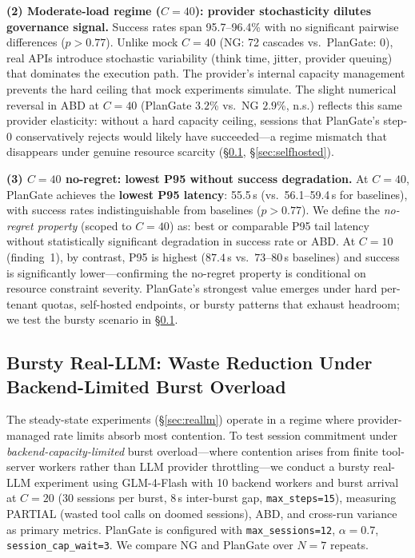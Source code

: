 \documentclass[sigconf,review,anonymous]{acmart}
\begin{document}
\textbf{(2) Moderate-load regime ($C{=}40$): provider stochasticity dilutes governance signal.}
Success rates span 95.7--96.4\% with no significant pairwise differences ($p{>}0.77$). Unlike mock $C{=}40$ (NG: 72 cascades vs.\ PlanGate: 0), real APIs introduce stochastic variability (think time, jitter, provider queuing) that dominates the execution path. The provider's internal capacity management prevents the hard ceiling that mock experiments simulate. The slight numerical reversal in ABD at $C{=}40$ (PlanGate $3.2$\% vs.\ NG $2.9$\%, n.s.) reflects this same provider elasticity: without a hard capacity ceiling, sessions that PlanGate's step-0 conservatively rejects would likely have succeeded---a regime mismatch that disappears under genuine resource scarcity (\S\ref{sec:bursty_reallm}, \S\ref{sec:selfhosted}).

\textbf{(3) $C{=}40$ no-regret: lowest P95 without success degradation.}
At $C{=}40$, PlanGate achieves the \textbf{lowest P95 latency}: 55.5\,s (vs.\ 56.1--59.4\,s for baselines), with success rates indistinguishable from baselines ($p{>}0.77$). We define the \emph{no-regret property} (scoped to $C{=}40$) as: best or comparable P95 tail latency without statistically significant degradation in success rate or ABD. At $C{=}10$ (finding~1), by contrast, P95 is highest ($87.4$\,s vs.\ $73$--$80$\,s baselines) and success is significantly lower---confirming the no-regret property is conditional on resource constraint severity. PlanGate's strongest value emerges under hard per-tenant quotas, self-hosted endpoints, or bursty patterns that exhaust headroom; we test the bursty scenario in \S\ref{sec:bursty_reallm}.


\subsection{Bursty Real-LLM: Waste Reduction Under Backend-Limited Burst Overload}
\label{sec:bursty_reallm}

The steady-state experiments (\S\ref{sec:reallm}) operate in a regime where provider-managed rate limits absorb most contention. To test session commitment under \emph{backend-capacity-limited} burst overload---where contention arises from finite tool-server workers rather than LLM provider throttling---we conduct a bursty real-LLM experiment using GLM-4-Flash with 10 backend workers and burst arrival at $C{=}20$ (30 sessions per burst, 8\,s inter-burst gap, \texttt{max\_steps=15}), measuring PARTIAL (wasted tool calls on doomed sessions), ABD, and cross-run variance as primary metrics. PlanGate is configured with \texttt{max\_sessions=12}, $\alpha{=}0.7$, \texttt{session\_cap\_wait=3}. We compare NG and PlanGate over $N{=}7$ repeats.
\end{document}
